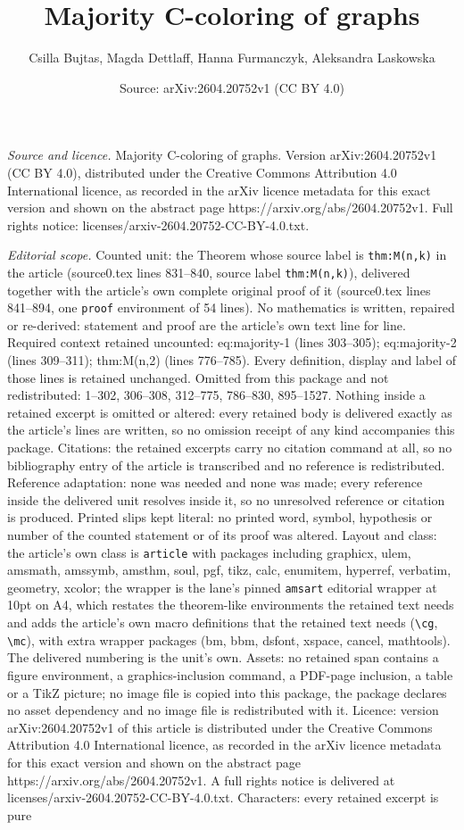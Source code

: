 \documentclass[10pt,a4paper]{amsart}
\title[Majority C-coloring of graphs]{Majority C-coloring of graphs}
\author{Csilla Bujtas, Magda Dettlaff, Hanna Furmanczyk, Aleksandra Laskowska}
\date{Source: arXiv:2604.20752v1 (CC BY 4.0)}
\begin{document}
\maketitle

\noindent\emph{Source and licence.} Majority C-coloring of graphs. Version arXiv:2604.20752v1 (CC BY 4.0), distributed under the Creative Commons Attribution 4.0 International licence, as recorded in the arXiv licence metadata for this exact version and shown on the abstract page https://arxiv.org/abs/2604.20752v1. Full rights notice: licenses/arxiv-2604.20752-CC-BY-4.0.txt.\par\smallskip

\noindent\textit{Editorial scope.} Counted unit: the Theorem whose source label is \texttt{thm:M(n,k)} in the article (source0.tex lines 831--840, source label \texttt{thm:M(n,k)}), delivered together with the article's own complete original proof of it (source0.tex lines 841--894, one \texttt{proof} environment of 54 lines). No mathematics is written, repaired or re-derived: statement and proof are the article's own text line for line. Required context retained uncounted: eq:majority-1 (lines 303--305); eq:majority-2 (lines 309--311); thm:M(n,2) (lines 776--785). Every definition, display and label of those lines is retained unchanged. Omitted from this package and not redistributed: 1--302, 306--308, 312--775, 786--830, 895--1527. Nothing inside a retained excerpt is omitted or altered: every retained body is delivered exactly as the article's lines are written, so no omission receipt of any kind accompanies this package. Citations: the retained excerpts carry no citation command at all, so no bibliography entry of the article is transcribed and no reference is redistributed. Reference adaptation: none was needed and none was made; every reference inside the delivered unit resolves inside it, so no unresolved reference or citation is produced. Printed slips kept literal: no printed word, symbol, hypothesis or number of the counted statement or of its proof was altered. Layout and class: the article's own class is \texttt{article} with packages including graphicx, ulem, amsmath, amssymb, amsthm, soul, pgf, tikz, calc, enumitem, hyperref, verbatim, geometry, xcolor; the wrapper is the lane's pinned \texttt{amsart} editorial wrapper at 10pt on A4, which restates the theorem-like environments the retained text needs and adds the article's own macro definitions that the retained text needs (\texttt{\textbackslash cg}, \texttt{\textbackslash mc}), with extra wrapper packages (bm, bbm, dsfont, xspace, cancel, mathtools). The delivered numbering is the unit's own. Assets: no retained span contains a figure environment, a graphics-inclusion command, a PDF-page inclusion, a table or a TikZ picture; no image file is copied into this package, the package declares no asset dependency and no image file is redistributed with it. Licence: version arXiv:2604.20752v1 of this article is distributed under the Creative Commons Attribution 4.0 International licence, as recorded in the arXiv licence metadata for this exact version and shown on the abstract page https://arxiv.org/abs/2604.20752v1. A full rights notice is delivered at licenses/arxiv-2604.20752-CC-BY-4.0.txt. Characters: every retained excerpt is pure 
\end{document}
